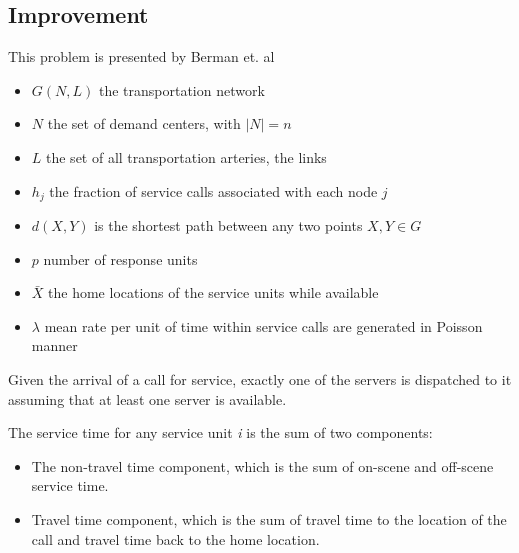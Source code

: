 \subsection{Improvement}
\begin{frame}
  This problem is presented by Berman et. al \cite{berman1987stochastic}

  \begin{itemize}
  \item $G(N,L)$ the transportation network
  \item $N$ the set of demand centers,
    with $|N| = n$
  \item $L$ the set of all transportation arteries,
    the links
  \item $h_j$ the fraction of service calls
    associated with each node $j$
  \item $d(X,Y)$ is the shortest path between any two points $X,Y \in G$
  \item $p$ number of response units
  \item $\bar{X}$ the home locations of the service units while available
  \item $\lambda$ mean rate per unit of time
    within service calls are generated in Poisson manner
  \end{itemize}
\end{frame}

\begin{frame}
  Given the arrival of a call for service,
  exactly one of the servers is dispatched to it
  assuming that at least one server is available.

  The service time for any service unit \textit{i}
  is the sum of two components:
  \begin{itemize}
  \item The non-travel time component,
    which is the sum of
    on-scene and off-scene service time.
  \item Travel time component,
    which is the sum of travel time
    to the location of the call
    and travel time back to the home location.
  \end{itemize}
\end{frame}

